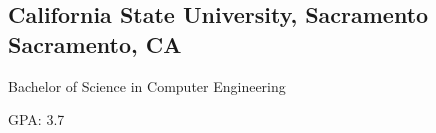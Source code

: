 \documentclass[a4,10pt]{article}
\newcommand{\subtext}[1]{
#1\par\vspace{-0.2cm}}
\newenvironment{zitemize}{
\begin{itemize}\itemsep0pt \parskip0pt \parsep1pt}
{\end{itemize}\vspace{-0.5cm}}
\begin{document}
\subsection*{California State University, Sacramento \hfill Sacramento, CA}
\subtext{Bachelor of Science in Computer Engineering }
\vspace{0.2cm}
\subtext{GPA: 3.7}
\vspace{0.1cm}



\end{document}
